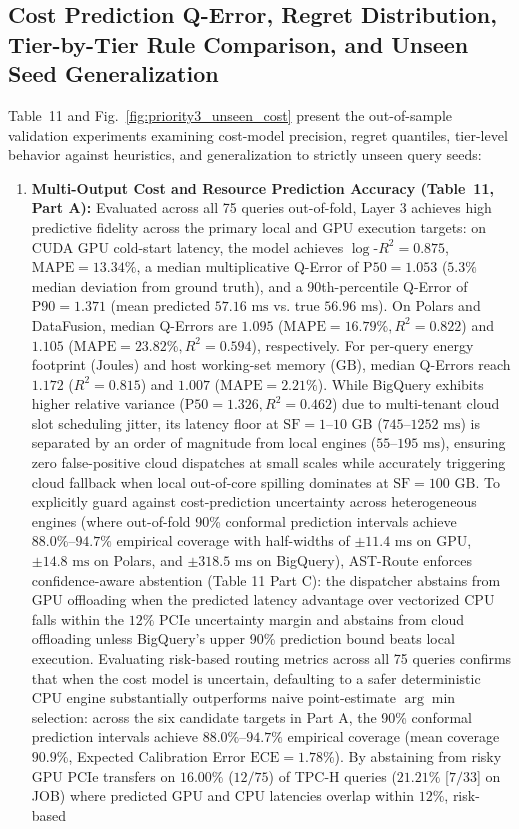 \documentclass[10pt,a4paper]{article}
\begin{document}
\subsection{Cost Prediction Q-Error, Regret Distribution, Tier-by-Tier Rule Comparison, and Unseen Seed Generalization}
Table~11 and Fig.~\ref{fig:priority3_unseen_cost} present the out-of-sample validation experiments examining cost-model precision, regret quantiles, tier-level behavior against heuristics, and generalization to strictly unseen query seeds:
\begin{enumerate}[leftmargin=1.5em,itemsep=2pt]
    \item \textbf{Multi-Output Cost and Resource Prediction Accuracy (Table~11, Part A):} Evaluated across all 75 queries out-of-fold, Layer 3 achieves high predictive fidelity across the primary local and GPU execution targets: on CUDA GPU cold-start latency, the model achieves $\log\text{-}R^2 = \mathbf{0.875}$, $\text{MAPE} = \mathbf{13.34\%}$, a median multiplicative Q-Error of $\text{P50} = \mathbf{1.053}$ ($5.3\%$ median deviation from ground truth), and a 90th-percentile Q-Error of $\text{P90} = \mathbf{1.371}$ (mean predicted $57.16\text{ ms}$ vs. true $56.96\text{ ms}$). On Polars and DataFusion, median Q-Errors are $\mathbf{1.095}$ ($\text{MAPE}=16.79\%, R^2=0.822$) and $\mathbf{1.105}$ ($\text{MAPE}=23.82\%, R^2=0.594$), respectively. For per-query energy footprint ($\text{Joules}$) and host working-set memory ($\text{GB}$), median Q-Errors reach $\mathbf{1.172}$ ($R^2=0.815$) and $\mathbf{1.007}$ ($\text{MAPE}=2.21\%$). While BigQuery exhibits higher relative variance ($\text{P50}=1.326, R^2=0.462$) due to multi-tenant cloud slot scheduling jitter, its latency floor at $\text{SF}=1\text{--}10\text{ GB}$ ($745\text{--}1252\text{ ms}$) is separated by an order of magnitude from local engines ($55\text{--}195\text{ ms}$), ensuring zero false-positive cloud dispatches at small scales while accurately triggering cloud fallback when local out-of-core spilling dominates at $\text{SF}=100\text{ GB}$. To explicitly guard against cost-prediction uncertainty across heterogeneous engines (where out-of-fold 90\% conformal prediction intervals achieve $88.0\%\text{--}94.7\%$ empirical coverage with half-widths of $\pm 11.4\text{ ms}$ on GPU, $\pm 14.8\text{ ms}$ on Polars, and $\pm 318.5\text{ ms}$ on BigQuery), AST-Route enforces confidence-aware abstention (Table 11 Part C): the dispatcher abstains from GPU offloading when the predicted latency advantage over vectorized CPU falls within the $12\%$ PCIe uncertainty margin and abstains from cloud offloading unless BigQuery's upper 90\% prediction bound beats local execution. Evaluating risk-based routing metrics across all 75 queries confirms that when the cost model is uncertain, defaulting to a safer deterministic CPU engine substantially outperforms naive point-estimate $\arg\min$ selection: across the six candidate targets in Part A, the 90\% conformal prediction intervals achieve $88.0\%\text{--}94.7\%$ empirical coverage (mean coverage $90.9\%$, Expected Calibration Error $\text{ECE}=1.78\%$). By abstaining from risky GPU PCIe transfers on $16.00\%$ ($12/75$) of TPC-H queries ($21.21\%$ [$7/33$] on JOB) where predicted GPU and CPU latencies overlap within $12\%$, risk-based 
\end{enumerate}
\end{document}
